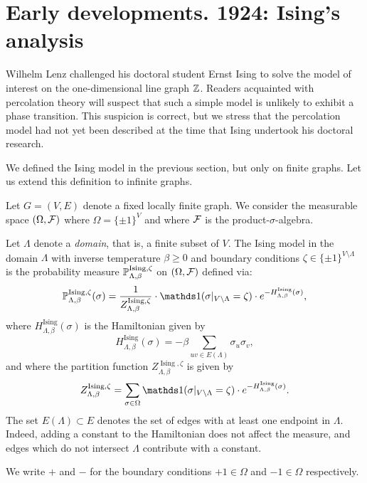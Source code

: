 \section{Early developments. 1924: Ising's analysis}
\label{sec:ising_1d}

Wilhelm Lenz challenged his doctoral student Ernst Ising
to solve the model of interest on the one-dimensional line graph $\Z$.
Readers acquainted with percolation theory
will suspect that such a simple model is unlikely to exhibit
a phase transition.
This suspicion is correct,
but we stress that the percolation model had not yet
been described at the time that Ising undertook his doctoral research.

We defined the Ising model in the previous section,
but only on finite graphs.
Let us extend this definition to infinite graphs.

\begin{definition}
    Let $G=(V,E)$ denote a fixed locally finite graph.
    We consider the measurable space 
    $(\Omega,\calF)$ where $\Omega=\{\pm1\}^V$
    and where $\calF$ is the product-$\sigma$-algebra.

    Let $\Lambda$ denote a \emph{domain},
    that is, a finite subset of $V$.
    The Ising model in the domain $\Lambda$
    with inverse temperature $\beta \geq 0$ and boundary conditions
    $\zeta\in\{\pm1\}^{V\setminus\Lambda}$
    is the probability measure $\P_{\Lambda,\beta}^{\operatorname{Ising},\zeta}$
    on $(\Omega,\calF)$ defined via:
    \[
        \P_{\Lambda,\beta}^{\operatorname{Ising},\zeta}(\sigma)
        =
        \frac1{Z_{\Lambda,\beta}^{\operatorname{Ising},\zeta}}
        \cdot
        \true{\sigma|_{V\setminus\Lambda}=\zeta}\cdot e^{-H_{\Lambda,\beta}^{\operatorname{Ising}}(\sigma)}
        ,
    \]
    where $H_{\Lambda,\beta}^{\operatorname{Ising}}(\sigma)$ is the Hamiltonian given by
    \[
        H_{\Lambda,\beta}^{\operatorname{Ising}}(\sigma)
        =
        -\beta\sum_{uv\in E(\Lambda)}\sigma_u\sigma_v
        ,
    \]
    and where the partition function $Z_{\Lambda,\beta}^{\operatorname{Ising},\zeta}$ is given by
    \[
        Z_{\Lambda,\beta}^{\operatorname{Ising},\zeta}
        =
        \sum_{\sigma \in \Omega} \true{\sigma|_{V\setminus\Lambda}=\zeta} \cdot e^{-H_{\Lambda,\beta}^{\operatorname{Ising}}(\sigma)}
        .
    \]
    The set $E(\Lambda)\subset E$ denotes 
    the set of edges with at least one endpoint in $\Lambda$.
    Indeed, adding a constant to the Hamiltonian does not affect the measure,
    and edges which do not intersect $\Lambda$ contribute with a constant.

    We write $+$ and $-$ for the boundary conditions
    $+1\in\Omega$ and $-1\in\Omega$ respectively.
\end{definition}

